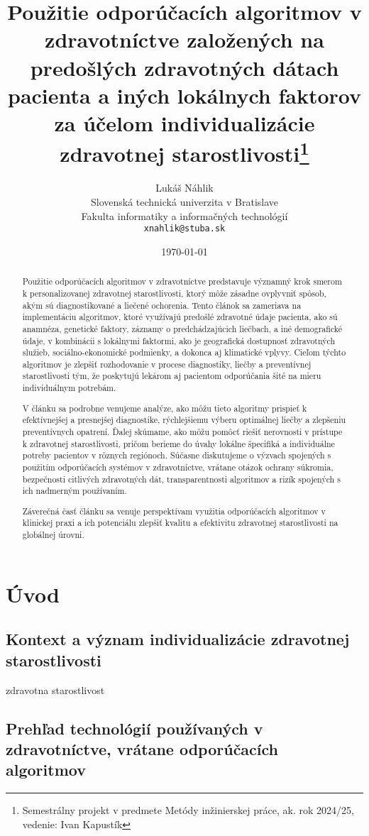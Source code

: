 \documentclass[10pt,twoside,,a4paper]{article}
\title{Použitie odporúčacích algoritmov v zdravotníctve založených na predošlých zdravotných dátach pacienta a iných lokálnych faktorov za účelom individualizácie zdravotnej starostlivosti\thanks{Semestrálny projekt v predmete Metódy inžinierskej práce, ak. rok 2024/25, vedenie: Ivan Kapustík}} %
\author{Lukáš Náhlik\\[2pt]
	{\small Slovenská technická univerzita v Bratislave}\\
	{\small Fakulta informatiky a informačných technológií}\\
	{\small \texttt{xnahlik@stuba.sk}}
	}
\date{\small \today}
\begin{document}
\maketitle

\begin{abstract}
Použitie odporúčacích algoritmov v zdravotníctve predstavuje významný krok smerom k personalizovanej zdravotnej starostlivosti, ktorý môže zásadne ovplyvniť spôsob, akým sú diagnostikované a liečené ochorenia. Tento článok sa zameriava na implementáciu algoritmov, ktoré využívajú predošlé zdravotné údaje pacienta, ako sú anamnéza, genetické faktory, záznamy o predchádzajúcich liečbach, a iné demografické údaje, v kombinácii s lokálnymi faktormi, ako je geografická dostupnosť zdravotných služieb, sociálno-ekonomické podmienky, a dokonca aj klimatické vplyvy. Cieľom týchto algoritmov je zlepšiť rozhodovanie v procese diagnostiky, liečby a preventívnej starostlivosti tým, že poskytujú lekárom aj pacientom odporúčania šité na mieru individuálnym potrebám.

V článku sa podrobne venujeme analýze, ako môžu tieto algoritmy prispieť k efektívnejšej a presnejšej diagnostike, rýchlejšiemu výberu optimálnej liečby a zlepšeniu preventívnych opatrení. Ďalej skúmame, ako môžu pomôcť riešiť nerovnosti v prístupe k zdravotnej starostlivosti, pričom berieme do úvahy lokálne špecifiká a individuálne potreby pacientov v rôznych regiónoch. Súčasne diskutujeme o výzvach spojených s použitím odporúčacích systémov v zdravotníctve, vrátane otázok ochrany súkromia, bezpečnosti citlivých zdravotných dát, transparentnosti algoritmov a rizík spojených s ich nadmerným používaním.

Záverečná časť článku sa venuje perspektívam využitia odporúčacích algoritmov v klinickej praxi a ich potenciálu zlepšiť kvalitu a efektivitu zdravotnej starostlivosti na globálnej úrovni. 
\end{abstract}
\newpage



\section{Úvod}
\subsection{Kontext a význam individualizácie zdravotnej starostlivosti}
zdravotna starostlivost
\cite{RSH}
\subsection{Prehľad technológií používaných v zdravotníctve, vrátane odporúčacích algoritmov}
\end{document}
